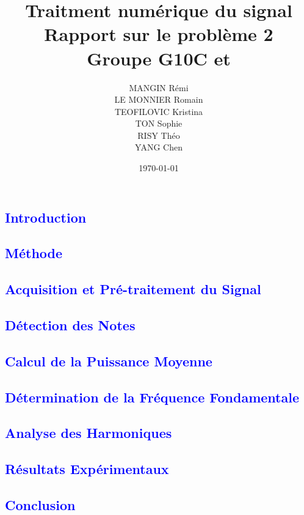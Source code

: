 \documentclass{article}
\title{Traitment numérique du signal \\ \vspace{5mm} Rapport sur le problème 2 \\ \vspace{3mm} Groupe G10C et }
\author{MANGIN Rémi \\
LE MONNIER Romain \\
TEOFILOVIC Kristina \\
TON Sophie \\
RISY Théo \\
YANG Chen}
\date{\today}
\begin{document}
\maketitle

\newpage
\tableofcontents
\newpage

\newpage
\textcolor{blue}{\section{Introduction}}

\textcolor{blue}{\section{Méthode}}

\textcolor{blue}{\subsection{Acquisition et Pré-traitement du Signal}}

\textcolor{blue}{\subsection{Détection des Notes}}

\textcolor{blue}{\subsection{Calcul de la Puissance Moyenne}}

\textcolor{blue}{\subsection{Détermination de la Fréquence Fondamentale}}

\textcolor{blue}{\subsection{Analyse des Harmoniques}}

\newpage
\textcolor{blue}{\section{Résultats Expérimentaux}}

\newpage
\textcolor{blue}{\section{Conclusion}}

\end{document}
